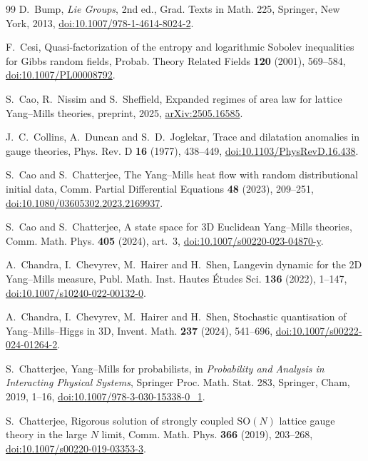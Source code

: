 \documentclass[aps,prd,twocolumn,superscriptaddress,nofootinbib,longbibliography,floatfix,amsmath,amssymb,10pt]{revtex4-2}
\theoremstyle{definition}
\theoremstyle{remark}
\newcommand{\SO}{\mathrm{SO}}
\begin{document}
\begin{thebibliography}{99}
D.~Bump, \emph{Lie Groups}, 2nd ed., Grad. Texts in Math. 225, Springer, New
York, 2013, \href{https://doi.org/10.1007/978-1-4614-8024-2}
{doi:10.1007/978-1-4614-8024-2}.

F.~Cesi, Quasi-factorization of the entropy and logarithmic Sobolev
inequalities for Gibbs random fields, Probab. Theory Related Fields
\textbf{120} (2001), 569--584,
\href{https://doi.org/10.1007/PL00008792}{doi:10.1007/PL00008792}.

S.~Cao, R.~Nissim and S.~Sheffield, Expanded regimes of area law for lattice Yang--Mills theories, preprint, 2025, \href{https://arxiv.org/abs/2505.16585}{arXiv:2505.16585}.

J.~C.~Collins, A.~Duncan and S.~D.~Joglekar, Trace and dilatation anomalies in gauge theories, Phys. Rev. D \textbf{16} (1977), 438--449, \href{https://doi.org/10.1103/PhysRevD.16.438}{doi:10.1103/PhysRevD.16.438}.

S.~Cao and S.~Chatterjee, The Yang--Mills heat flow with random
distributional initial data, Comm. Partial Differential Equations
\textbf{48} (2023), 209--251,
\href{https://doi.org/10.1080/03605302.2023.2169937}{doi:10.1080/03605302.2023.2169937}.

 S.~Cao and S.~Chatterjee, A state space for 3D Euclidean
Yang--Mills theories, Comm. Math. Phys. \textbf{405} (2024), art.~3,
\href{https://doi.org/10.1007/s00220-023-04870-y}{doi:10.1007/s00220-023-04870-y}.

 A.~Chandra, I.~Chevyrev, M.~Hairer and H.~Shen, Langevin
dynamic for the 2D Yang--Mills measure, Publ. Math. Inst. Hautes \'Etudes
Sci. \textbf{136} (2022), 1--147,
\href{https://doi.org/10.1007/s10240-022-00132-0}{doi:10.1007/s10240-022-00132-0}.

 A.~Chandra, I.~Chevyrev, M.~Hairer and H.~Shen, Stochastic
quantisation of Yang--Mills--Higgs in 3D, Invent. Math. \textbf{237} (2024),
541--696,
\href{https://doi.org/10.1007/s00222-024-01264-2}{doi:10.1007/s00222-024-01264-2}.

S.~Chatterjee, Yang--Mills for probabilists, in \emph{Probability and Analysis in Interacting Physical Systems}, Springer Proc. Math. Stat. 283, Springer, Cham, 2019, 1--16, \href{https://doi.org/10.1007/978-3-030-15338-0_1}{doi:10.1007/978-3-030-15338-0\_1}.

S.~Chatterjee, Rigorous solution of strongly coupled $\SO(N)$ lattice gauge theory in the large $N$ limit, Comm. Math. Phys. \textbf{366} (2019), 203--268, \href{https://doi.org/10.1007/s00220-019-03353-3}{doi:10.1007/s00220-019-03353-3}.


\end{thebibliography}
\end{document}
